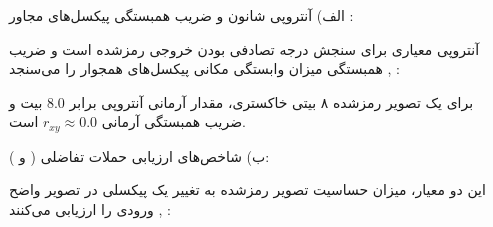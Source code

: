 

الف) آنتروپی شانون  و ضریب همبستگی پیکسل‌های مجاور :\par

آنتروپی معیاری برای سنجش درجه تصادفی بودن خروجی رمزشده است و ضریب همبستگی میزان وابستگی مکانی پیکسل‌های همجوار را می‌سنجد , :\par






برای یک تصویر رمزشده ۸ بیتی خاکستری، مقدار آرمانی آنتروپی برابر $8.0$ بیت و ضریب همبستگی آرمانی $r_{xy} \approx 0.0$ است.\par



ب) شاخص‌های ارزیابی حملات تفاضلی ( و ):\par

این دو معیار، میزان حساسیت تصویر رمزشده به تغییر یک پیکسلی در تصویر واضح ورودی را ارزیابی می‌کنند , :\par






